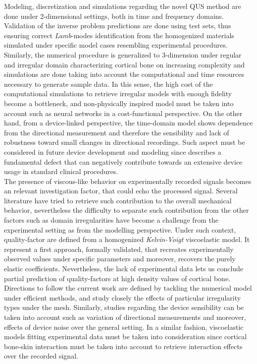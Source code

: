 \begin{conclusion}
Modeling, discretization and simulations regarding the novel QUS method are done under 2-dimensional settings, both in time and frequency domains. Validation of the inverse problem predictions are done using test sets, thus ensuring correct \textit{Lamb}-modes identification from the homogenized materials simulated under specific model cases resembling experimental procedures. Similarly, the numerical procedure is generalized to 3-dimension under regular and irregular domain characterizing cortical bone on increasing complexity and simulations are done taking into account the computational and time resources necessary to generate sample data. In this sense, the high cost of the computational simulations to retrieve irregular models with enough fidelity become a bottleneck, and non-physically inspired model must be taken into account such as neural networks in a cost-functional perspective.
On the other hand, from a device-linked perspective, the time-domain model shows dependence from the directional measurement and therefore the sensibility and lack of robustness toward small changes in directional recordings. Such aspect must be considered in future device development and modeling since describes a fundamental defect that can negatively contribute towards an extensive device usage in standard clinical procedures.
\\

The presence of viscous-like behavior on experimentally recorded signals becomes an relevant investigation factor, that could echo the processed signal. Several literature have tried to retrieve such contribution to the overall mechanical behavior, nevertheless the difficulty to separate such contribution from the other factors such as domain irregularities have become a challenge from the experimental setting as from the modelling perspective. Under such context, quality-factor are defined from a homogenized \textit{Kelvin-Voigt} viscoelastic model. It represent a first approach, formally validated, that recreates experimentally observed values under specific parameters and moreover, recovers the purely elastic coefficients. 
Nevertheless, the lack of experimental data lets us conclude partial prediction of quality-factors at high density values of cortical bone. 
\\

Directions to follow the current work are defined by tackling the numerical model under efficient methods, and study closely the effects of particular irregularity types under the mesh. Similarly, studies regarding the device sensibility can be taken into account such as variation of directional measurements and moreover, effects of device noise over the general setting. 
In a similar fashion, viscoelastic models fitting experimental data must be taken into consideration since cortical bone-skin interaction must be taken into account to retrieve interaction effects over the recorded signal.
\end{conclusion}

